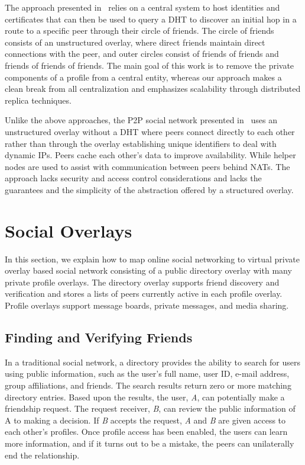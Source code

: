 \documentclass[conference]{IEEEtran}
\begin{document}
The approach presented in~\cite{matryoshka} relies on a central system to host
identities and certificates that can then be used to query a DHT to discover
an initial hop in a route to a specific peer through their circle of friends.
The circle of friends consists of an unstructured overlay, where direct
friends maintain direct connections with the peer, and outer circles consist
of friends of friends and friends of friends of friends.  The main goal of
this work is to remove the private components of a profile from a central
entity, whereas our approach makes a clean break from all centralization and
emphasizes scalability through distributed replica techniques.

Unlike the above approaches, the P2P social network presented
in~\cite{tribler-osn} uses an unstructured overlay without a DHT where peers
connect directly to each other rather than through the overlay establishing
unique identifiers to deal with dynamic IPs.  Peers cache each other's data to
improve availability.  While helper nodes are used to assist with
communication between peers behind NATs.  The approach lacks security and
access control considerations and lacks the guarantees and the simplicity of
the abstraction offered by a structured overlay.

\section{Social Overlays}
\label{social_overlays}

In this section, we explain how to map online social networking to virtual
private overlay based social network consisting of a public directory overlay
with many private profile overlays.  The directory overlay supports friend
discovery and verification and stores a lists of peers currently active in
each profile overlay.  Profile overlays support message boards, private
messages, and media sharing.

\subsection{Finding and Verifying Friends}

In a traditional social network, a directory provides the ability to search
for users using public information, such as the user's full name, user ID,
e-mail address, group affiliations, and friends.  The search results return
zero or more matching directory entries.  Based upon the results, the user,
\textit{A}, can potentially make a friendship request.  The request receiver,
\textit{B}, can review the public information of A to making a decision.  If
\textit{B} accepts the request, \textit{A} and \textit{B} are given access to
each other's profiles.  Once profile access has been enabled, the users can
learn more information, and if it turns out to be a mistake, the peers can
unilaterally end the relationship.
\end{document}
